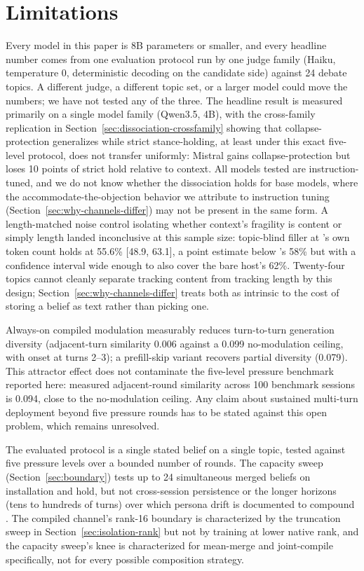 \section{Limitations}
\label{sec:limitations}

Every model in this paper is 8B parameters or smaller, and every headline number comes
from one evaluation protocol run by one judge family (Haiku, temperature 0,
deterministic decoding on the candidate side) against 24 debate topics. A different
judge, a different topic set, or a larger model could move the numbers; we have not
tested any of the three. The headline result is measured primarily on a single model
family (Qwen3.5, 4B), with the cross-family replication in
Section~\ref{sec:dissociation-crossfamily} showing that collapse-protection generalizes
while strict stance-holding, at least under this exact five-level protocol, does not
transfer uniformly: Mistral gains collapse-protection but loses 10 points of strict
hold relative to context. All models tested are instruction-tuned, and we do not know
whether the dissociation holds for base models, where the accommodate-the-objection
behavior we attribute to instruction tuning (Section~\ref{sec:why-channels-differ}) may
not be present in the same form. A length-matched noise control isolating whether
context's fragility is content or simply length landed inconclusive at this sample
size: topic-blind filler at \condB{}'s own token count holds at 55.6\% [48.9, 63.1], a
point estimate below \condB{}'s 58\% but with a confidence interval wide enough to also
cover the bare host's 62\%. Twenty-four topics cannot cleanly separate tracking content
from tracking length by this design; Section~\ref{sec:why-channels-differ} treats both
as intrinsic to the cost of storing a belief as text rather than picking one.

Always-on compiled modulation measurably reduces turn-to-turn generation diversity
(adjacent-turn similarity 0.006 against a 0.099 no-modulation ceiling, with onset at
turns 2--3); a prefill-skip variant recovers partial diversity (0.079). This attractor
effect does not contaminate the five-level pressure benchmark reported here: measured
adjacent-round similarity across 100 benchmark sessions is 0.094, close to the
no-modulation ceiling. Any claim about sustained multi-turn deployment beyond five
pressure rounds has to be stated against this open problem, which remains unresolved.

The evaluated protocol is a single stated belief on a single topic, tested against five
pressure levels over a bounded number of rounds. The capacity sweep
(Section~\ref{sec:boundary}) tests up to 24 simultaneous merged beliefs on installation
and hold, but not cross-session persistence or the longer horizons (tens to hundreds of
turns) over which persona drift is documented to compound \citep{li2024measuring}. The
compiled channel's rank-16 boundary is characterized by the truncation
sweep\iflongversion{} in Section~\ref{sec:isolation-rank}\fi{} but not by training at lower native rank, and the
capacity sweep's knee is characterized for mean-merge and joint-compile specifically,
not for every possible composition strategy.

